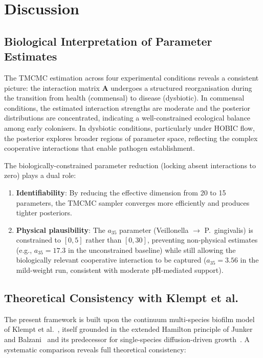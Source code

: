 \documentclass[11pt,a4paper]{article}
\begin{document}
\section{Discussion}
\label{sec:discussion}

\subsection{Biological Interpretation of Parameter Estimates}
\label{sec:baseline_comparison}

The TMCMC estimation across four experimental conditions reveals a consistent picture: the interaction matrix $\mathbf{A}$ undergoes a structured reorganisation during the transition from health (commensal) to disease (dysbiotic).
In commensal conditions, the estimated interaction strengths are moderate and the posterior distributions are concentrated, indicating a well-constrained ecological balance among early colonisers.
In dysbiotic conditions, particularly under HOBIC flow, the posterior explores broader regions of parameter space, reflecting the complex cooperative interactions that enable pathogen establishment.

The biologically-constrained parameter reduction (locking absent interactions to zero) plays a dual role:
\begin{enumerate}
  \item \textbf{Identifiability}: By reducing the effective dimension from 20 to 15 parameters, the TMCMC sampler converges more efficiently and produces tighter posteriors.
  \item \textbf{Physical plausibility}: The $a_{35}$ parameter (Veillonella $\to$ P.~gingivalis) is constrained to $[0,5]$ rather than $[0,30]$, preventing non-physical estimates (e.g., $a_{35} = 17.3$ in the unconstrained baseline) while still allowing the biologically relevant cooperative interaction to be captured ($a_{35} = 3.56$ in the mild-weight run, consistent with moderate pH-mediated support).
\end{enumerate}

\subsection{Theoretical Consistency with Klempt et al.}
\label{sec:consistency}

The present framework is built upon the continuum multi-species biofilm model of Klempt et al.~\cite{Klempt2025ContinuumBiofilm}, itself grounded in the extended Hamilton principle of Junker and Balzani~\cite{JunkerBalzani2021ExtendedHamilton} and its predecessor for single-species diffusion-driven growth~\cite{Klempt2024ContinuumGrowth}. A systematic comparison reveals full theoretical consistency:
\end{document}
